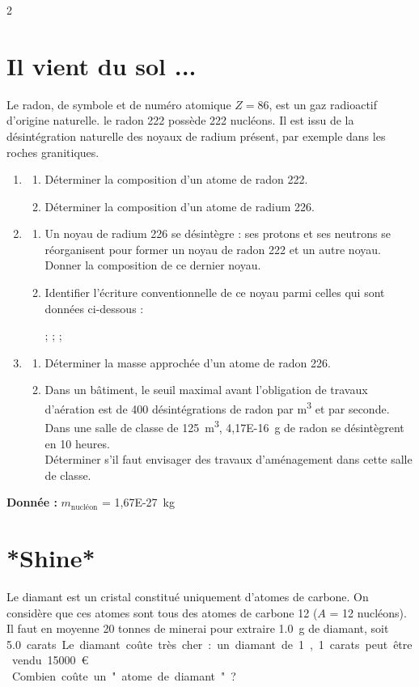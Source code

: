 \documentclass[a4paper,11pt,fleqn]{article}%
\begin{document}
\begin{multicols}{2}
\section{Il vient du sol ...}
Le radon, de symbole  et de numéro atomique $Z=86$, est un gaz radioactif d'origine naturelle. le radon 222 possède 222 nucléons. Il est issu de la désintégration naturelle des noyaux de radium  présent, par exemple dans les roches granitiques.
\begin{enumerate}
	\item \begin{enumerate}
		\item Déterminer la composition d'un atome de radon 222.
		\item Déterminer la composition d'un atome de radium 226.
	\end{enumerate}
	\item \begin{enumerate}
		\item Un noyau de radium 226 se désintègre : ses protons et ses neutrons se réorganisent pour former un noyau de radon 222 et un autre noyau. Donner la composition de ce dernier noyau.
		\item Identifier l'écriture conventionnelle de ce noyau parmi celles qui sont données ci-dessous :
		\begin{center}
			 ;  ;  ; 
		\end{center}
	\end{enumerate}
	\item \begin{enumerate}
		\item Déterminer la masse approchée d'un atome de radon 226.
		\item Dans un bâtiment, le seuil maximal avant l'obligation de travaux d'aération est de 400 désintégrations de radon par \unit{\meter\cubed} et par seconde. Dans une salle de classe de \SI{125}{\meter\cubed}, \SI{4,17E-16}{g} de radon se désintègrent en 10 heures.\\ Déterminer s'il faut envisager des travaux d'aménagement dans cette salle de classe.
	\end{enumerate}
\end{enumerate}
\textbf{Donnée :} $m_{\text{nucléon}}$ = \SI{1,67E-27}{kg}

\section{*Shine*}
Le diamant est un cristal constitué uniquement d'atomes de carbone. On considère que ces atomes sont tous des atomes de carbone 12 ($A$ = 12 nucléons). Il faut en moyenne 20 tonnes de minerai pour extraire \SI{1,0}{g} de diamant, soit \SI{5,0} carats. Le diamant coûte très cher : un diamant de 1,1 carats peut être vendu \SI{15000}{€}.\\
Combien coûte un "atome de diamant" ?


\end{multicols}
\end{document}
